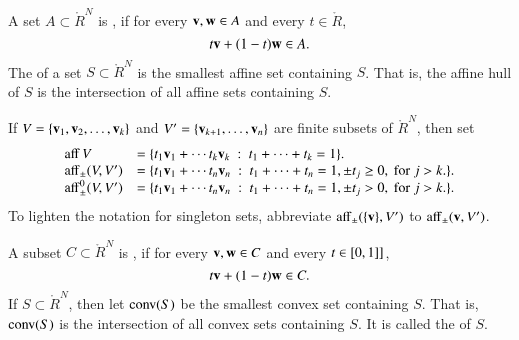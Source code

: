\begin{definition}
A set $A\subset\ring{R}^N$ is , if for
every ${\mathbf v},{\mathbf w}\in A$ and every $t \in \ring{R}$, 
\begin{displaymath}
  t {\mathbf v} + (1-t) {\mathbf w} \in A.
\end{displaymath}
The  of a set $S\subset\ring{R}^N$ is the smallest affine set
containing $S$. 
That is, the affine hull of $S$ is the intersection of all affine
sets containing $S$. 
\end{definition}


\begin{definition}[affine]\label{def:aff} 
  If $V = \{{\mathbf v}_1,{\mathbf v}_2,\ldots,{\mathbf v}_k\}$ and $V'=\{{\mathbf v}_{k+1},\ldots,{\mathbf v}_n\}$
  are finite subsets of $\ring{R}^N$, then set
	\begin{displaymath}\begin{array}{lll}
{\operatorname{aff}}\, V &= \{t_1 {\mathbf v}_1 +\cdots t_k {\mathbf v}_k \ :\ 
	t_1 +\cdots+t_k = 1\}.\\
{\operatorname{aff}}_{\pm} (V,V') &= \{t_1 {\mathbf v}_1 +\cdots t_n {\mathbf v}_n \ :\ 
	t_1 +\cdots+t_n = 1, \pm t_j \ge 0, \text{ for } j>k.\}.\\
{\operatorname{aff}}^0_{\pm} (V,V') &= \{t_1 {\mathbf v}_1 +\cdots t_n {\mathbf v}_n \ :\ 
	t_1 +\cdots+t_n = 1, \pm t_j > 0, \text{ for } j>k.\}.\\
		\end{array}
\end{displaymath}
To lighten the notation for singleton sets, abbreviate
${\operatorname{aff}}_\pm(\{{\mathbf v}\},V')$ to ${\operatorname{aff}}_\pm({\mathbf v},V')$.
%
%
%
%
%
\end{definition}



\begin{definition} 
A subset $C\subset\ring{R}^N$ is , if for
every ${\mathbf v},{\mathbf w}\in C$ and every $t \in [0,1]]$,
\begin{displaymath}
t {\mathbf v} + (1-t) {\mathbf w} \in C.
\end{displaymath}
If $S\subset\ring{R}^N$, then let ${\operatorname{conv}}(S)$ be the smallest convex set
containing $S$.  That is, ${\operatorname{conv}}(S)$ is the intersection of all convex
sets containing $S$.  It is called the  of $S$.
\end{definition}

